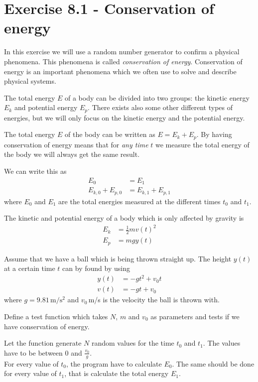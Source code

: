 \documentclass[10pt,a4paper]{article}
\begin{document}
\section*{Exercise 8.1 - Conservation of energy}
In this exercise we will use a random number generator to confirm a physical phenomena. This phenomena is called \textit{conservation of energy}. Conservation of energy is an important phenomena which we often use to solve and describe physical systems.

The total energy $E$ of a body can be divided into two groups: the kinetic energy $E_k$ and potential energy $E_p$. There exists also some other different types of energies, but we will only focus on the kinetic energy and the potential energy.  

The total energy $E$ of the body can be written as $E = E_k + E_p$. 
By having conservation of energy means that for \textit{any time} $t$ we measure the total energy of the body we will always get the same result. 

We can write this as
\begin{align*}
E_0 &= E_1 \\
E_{k,0} + E_{p,0} &= E_{k,1} + E_{p,1}
\end{align*}
where $E_0$ and $E_1$ are the total energies measured at the different times $t_0$ and $t_1$. 

The kinetic and potential energy of a body which is only affected by gravity is
\begin{align*}
E_k &= \frac{1}{2}mv(t)^2 \\
E_p &= mgy(t)
\end{align*}

Assume that we have a ball which is being thrown straight up. The height $y(t)$ at a certain time $t$ can by found by using
\begin{align*}
y(t) &= -gt^2 + v_0t \\
v(t) &= -gt + v_0
\end{align*}
where $g = 9.81\,\mathrm{m/s^2}$ and $v_0\,$m/s is the velocity the ball is thrown with.

Define a test function which takes $N$, $m$ and $v_0$ as parameters and tests if we have conservation of energy. 

Let the function generate $N$ random values for the time $t_0$ and $t_1$. The values have to be between 0 and $\frac{v_0}{g}$. \\
For every value of $t_0$, the program have to calculate $E_0$. The same should be done for every value of $t_1$, that is calculate the total energy $E_1$. 
\end{document}
